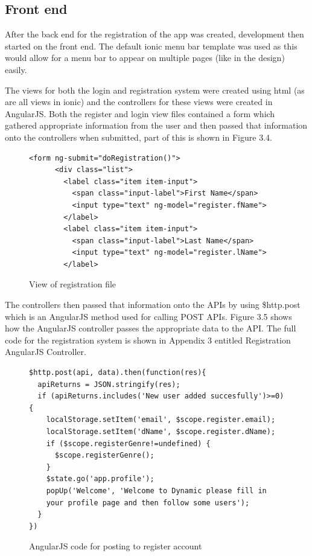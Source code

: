\subsection{Front end}
After the back end for the registration of the app was created, development then started on the front end. The default ionic menu bar template was used as this would allow for a menu bar to appear on multiple pages (like in the design) easily.

The views for both the login and registration system were created using html (as are all views in ionic) and the controllers for these views were created in AngularJS. Both the register and login view files contained a form which gathered appropriate information from the user and then passed that information onto the controllers when submitted, part of this is shown in Figure 3.4.

\begin{center}
\begin{figure}[H]
\begin{verbatim}
<form ng-submit="doRegistration()">
      <div class="list">
        <label class="item item-input">
          <span class="input-label">First Name</span>
          <input type="text" ng-model="register.fName">
        </label>
        <label class="item item-input">
          <span class="input-label">Last Name</span>
          <input type="text" ng-model="register.lName">
        </label>
\end{verbatim}
\caption{View of registration file}
\end{figure}
\end{center}

The controllers then passed that information onto the APIs by using \$http.post which is an AngularJS method used for calling POST APIs. Figure 3.5 shows how the AngularJS controller passes the appropriate data to the API. The full code for the registration system is shown in Appendix 3 entitled Registration AngularJS Controller.
\begin{center}
\begin{figure}[H]
\begin{verbatim}
$http.post(api, data).then(function(res){
  apiReturns = JSON.stringify(res);
  if (apiReturns.includes('New user added succesfully')>=0) {
    localStorage.setItem('email', $scope.register.email);
    localStorage.setItem('dName', $scope.register.dName);
    if ($scope.registerGenre!=undefined) {
      $scope.registerGenre();
    }
    $state.go('app.profile');
    popUp('Welcome', 'Welcome to Dynamic please fill in 
    your profile page and then follow some users');
  }
})
\end{verbatim}
\caption{AngularJS code for posting to register account}
\end{figure}
\end{center}

